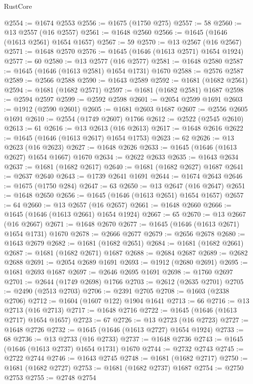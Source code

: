 \begin{lexlean}{RustCore}
\begin{coremodule}
@2554 := @1674 @2553
@2556 := @1675 (@1750 @275)
@2557 := 58
@2560 := @13 @2557 (@16 @2557)
@2561 := @1648 @2560
@2566 := @1645 (@1646 (@1613 @2561) @1654 @1657)
@2567 := 59
@2570 := @13 @2567 (@16 @2567)
@2571 := @1648 @2570
@2576 := @1645 (@1646 (@1613 @2571) @1654 @1924)
@2577 := 60
@2580 := @13 @2577 (@16 @2577)
@2581 := @1648 @2580
@2587 := @1645 (@1646 (@1613 @2581) @1654 @1731) @1670
@2588 := @2576 @2587
@2589 := @2566 @2588
@2590 := @1643 @2589
@2592 := @1681 (@1682 @2561)
@2594 := @1681 (@1682 @2571)
@2597 := @1681 (@1682 @2581) @1687
@2598 := @2594 @2597
@2599 := @2592 @2598
@2601 := @2054 @2599 @1691
@2603 := @1912 (@2590 @2601)
@2605 := @1681 @2603 @1687
@2607 := @2556 @2605 @1691
@2610 := @2554 (@1749 @2607) @1766
@2612 := @2522 (@2545 @2610)
@2613 := 61
@2616 := @13 @2613 (@16 @2613)
@2617 := @1648 @2616
@2622 := @1645 (@1646 (@1613 @2617) @1654 @1753)
@2623 := 62
@2626 := @13 @2623 (@16 @2623)
@2627 := @1648 @2626
@2633 := @1645 (@1646 (@1613 @2627) @1654 @1667) @1670
@2634 := @2622 @2633
@2635 := @1643 @2634
@2637 := @1681 (@1682 @2617)
@2640 := @1681 (@1682 @2627) @1687
@2641 := @2637 @2640
@2643 := @1739 @2641 @1691
@2644 := @1674 @2643
@2646 := @1675 (@1750 @284)
@2647 := 63
@2650 := @13 @2647 (@16 @2647)
@2651 := @1648 @2650
@2656 := @1645 (@1646 (@1613 @2651) @1654 @1657)
@2657 := 64
@2660 := @13 @2657 (@16 @2657)
@2661 := @1648 @2660
@2666 := @1645 (@1646 (@1613 @2661) @1654 @1924)
@2667 := 65
@2670 := @13 @2667 (@16 @2667)
@2671 := @1648 @2670
@2677 := @1645 (@1646 (@1613 @2671) @1654 @1731) @1670
@2678 := @2666 @2677
@2679 := @2656 @2678
@2680 := @1643 @2679
@2682 := @1681 (@1682 @2651)
@2684 := @1681 (@1682 @2661)
@2687 := @1681 (@1682 @2671) @1687
@2688 := @2684 @2687
@2689 := @2682 @2688
@2691 := @2054 @2689 @1691
@2693 := @1912 (@2680 @2691)
@2695 := @1681 @2693 @1687
@2697 := @2646 @2695 @1691
@2698 := @1760 @2697
@2701 := @2644 (@1749 @2698) @1766
@2703 := @2612 (@2635 @2701)
@2705 := @2490 (@2513 @2703)
@2706 := @2391 @2705
@2708 := @1603 (@2338 @2706)
@2712 := @1604 (@1607 @122) @1904 @1641
@2713 := 66
@2716 := @13 @2713 (@16 @2713)
@2717 := @1648 @2716
@2722 := @1645 (@1646 (@1613 @2717) @1654 @1657)
@2723 := 67
@2726 := @13 @2723 (@16 @2723)
@2727 := @1648 @2726
@2732 := @1645 (@1646 (@1613 @2727) @1654 @1924)
@2733 := 68
@2736 := @13 @2733 (@16 @2733)
@2737 := @1648 @2736
@2743 := @1645 (@1646 (@1613 @2737) @1654 @1731) @1670
@2744 := @2732 @2743
@2745 := @2722 @2744
@2746 := @1643 @2745
@2748 := @1681 (@1682 @2717)
@2750 := @1681 (@1682 @2727)
@2753 := @1681 (@1682 @2737) @1687
@2754 := @2750 @2753
@2755 := @2748 @2754

\end{coremodule}
\end{lexlean}
